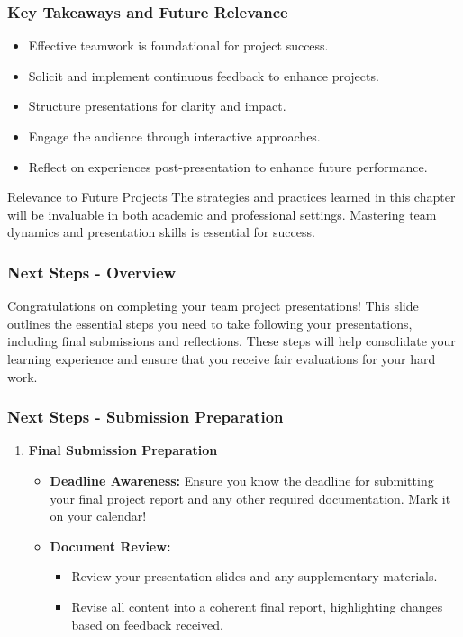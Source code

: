 \documentclass[aspectratio=169]{beamer}
\begin{document}
\begin{frame}[fragile]
    \frametitle{Key Takeaways and Future Relevance}
    \begin{itemize}
        \item Effective teamwork is foundational for project success.
        \item Solicit and implement continuous feedback to enhance projects.
        \item Structure presentations for clarity and impact.
        \item Engage the audience through interactive approaches.
        \item Reflect on experiences post-presentation to enhance future performance.
    \end{itemize}

    \begin{block}{Relevance to Future Projects}
        The strategies and practices learned in this chapter will be invaluable in both academic and professional settings. Mastering team dynamics and presentation skills is essential for success.
    \end{block}
\end{frame}

\begin{frame}[fragile]
  \frametitle{Next Steps - Overview}
  Congratulations on completing your team project presentations! This slide outlines the essential steps you need to take following your presentations, including final submissions and reflections. These steps will help consolidate your learning experience and ensure that you receive fair evaluations for your hard work.
\end{frame}

\begin{frame}[fragile]
  \frametitle{Next Steps - Submission Preparation}
  \begin{enumerate}
    \item \textbf{Final Submission Preparation}
    \begin{itemize}
      \item \textbf{Deadline Awareness:} Ensure you know the deadline for submitting your final project report and any other required documentation. Mark it on your calendar!
      \item \textbf{Document Review:}
      \begin{itemize}
        \item Review your presentation slides and any supplementary materials.
        \item Revise all content into a coherent final report, highlighting changes based on feedback received.
      \end{itemize}
    \end{itemize}
  \end{enumerate}
\end{frame}
\end{document}
